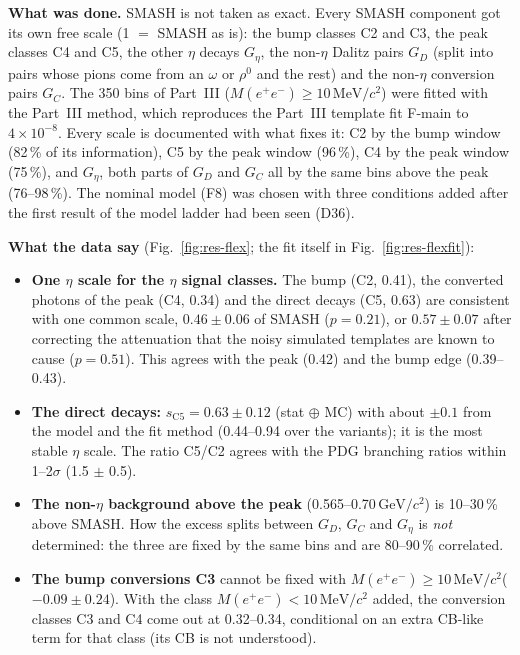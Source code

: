 \documentclass[11pt,a4paper]{article}
\newcommand{\Mee}{\ensuremath{M(e^{+}e^{-})}\xspace}
\newcommand{\GeVcc}{\ensuremath{\mathrm{GeV}/c^{2}}\xspace}
\newcommand{\MeVcc}{\ensuremath{\mathrm{MeV}/c^{2}}\xspace}
\newcommand{\Geta}{\ensuremath{G_\eta}\xspace}
\begin{document}
\textbf{What was done.} SMASH is not taken as exact. Every SMASH component got its own free scale (1 $=$ SMASH as is): the bump classes C2 and
C3, the peak classes C4 and C5, the other $\eta$ decays \Geta, the non-$\eta$ Dalitz pairs $G_D$ (split into pairs whose pions come from an $\omega$
or $\rho^0$ and the rest) and the non-$\eta$ conversion pairs $G_C$. The 350 bins of Part~III (\Mee$\ge10$\,\MeVcc) were fitted with the Part~III
method, which reproduces the Part~III template fit F-main to $4\times10^{-8}$. Every scale is documented with what fixes it: C2 by the bump window
(82\,\% of its information), C5 by the peak window (96\,\%), C4 by the peak window (75\,\%), and \Geta, both parts of $G_D$ and $G_C$ all by the
same bins above the peak (76--98\,\%). The nominal model (F8) was chosen with three conditions added after the first result of the model ladder
had been seen (D36).

\textbf{What the data say} (Fig.~\ref{fig:res-flex}; the fit itself in Fig.~\ref{fig:res-flexfit}):
\begin{itemize}\setlength{\itemsep}{1pt}
\item \textbf{One $\eta$ scale for the $\eta$ signal classes.} The bump (C2, 0.41), the converted photons of the peak (C4, 0.34) and the direct decays
      (C5, 0.63) are consistent with one common scale, $0.46\pm0.06$ of SMASH ($p=0.21$), or $0.57\pm0.07$ after correcting the attenuation that
      the noisy simulated templates are known to cause ($p=0.51$). This agrees with the peak (0.42) and the bump edge (0.39--0.43).
\item \textbf{The direct decays:} $s_{\mathrm{C5}}=0.63\pm0.12$ (stat $\oplus$ MC) with about $\pm0.1$ from the model and the fit method (0.44--0.94 over
      the variants); it is the most stable $\eta$ scale. The ratio C5/C2 agrees with the PDG branching ratios within 1--2$\sigma$ (1.5 $\pm$ 0.5).
\item \textbf{The non-$\eta$ background above the peak} (0.565--0.70\,\GeVcc) is 10--30\,\% above SMASH. How the excess splits between $G_D$, $G_C$
      and \Geta is \emph{not} determined: the three are fixed by the same bins and are 80--90\,\% correlated.
\item \textbf{The bump conversions C3} cannot be fixed with \Mee$\ge10$\,\MeVcc ($-0.09\pm0.24$). With the class \Mee$<10$\,\MeVcc added, the
      conversion classes C3 and C4 come out at 0.32--0.34, conditional on an extra CB-like term for that class (its CB is not understood).
\end{itemize}
\end{document}
